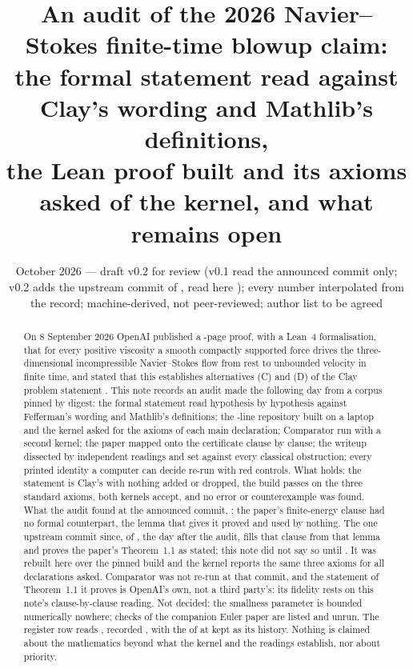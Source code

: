 \documentclass[11pt]{article}
\title{An audit of the 2026 Navier--Stokes finite-time blowup claim:\\
the formal statement read against Clay's wording and Mathlib's definitions,\\
the Lean proof built and its axioms asked of the kernel, and what remains open}
\author{\cmauthor}
\date{October 2026 --- draft v0.2 for review (v0.1 read the announced commit only; v0.2 adds the upstream commit of \UpCommitDate, read here \UpReadOn); every number interpolated from the record; machine-derived, not peer-reviewed; author list to be agreed}
\newcommand{\lean}[1]{\texttt{#1}}
\begin{document}
\maketitle

\begin{abstract}
On 8 September 2026 OpenAI published a \PaperPages-page proof, with a Lean~4 formalisation,
that for every positive viscosity a smooth compactly supported force drives the
three-dimensional incompressible Navier--Stokes flow from rest to unbounded velocity in
finite time, and stated that this establishes alternatives (C) and (D) of the Clay problem
statement \cite{OAIann,OAINS,Fef00}. This note records an audit made the following day from
a corpus pinned by digest: the formal statement read hypothesis by hypothesis against
Fefferman's wording and Mathlib's definitions; the \LeanLines-line repository built on a
laptop and the kernel asked for the axioms of each main declaration; Comparator run with a
second kernel; the paper mapped onto the certificate clause by clause; the writeup dissected
by \Readers{} independent readings and set against every classical obstruction; every
printed identity a computer can decide re-run with red controls. What
holds: the statement is Clay's with nothing added or dropped, the build passes on the three
standard axioms, both kernels accept, and no error or counterexample was found. What the
audit found at the announced commit, \lean{\LeanCommit}: the paper's finite-energy clause had
no formal counterpart, the lemma that gives it proved and used by nothing. The one upstream
commit since, \lean{\UpCommit} of \UpCommitDate, the day after the audit, fills that clause
from that lemma and proves the paper's Theorem~1.1 as stated; this note did not say so until
\UpReadOn. It was rebuilt here over the pinned build and the kernel reports the same three
axioms for all \UpAxiomDecls{} declarations asked. Comparator was not re-run at that commit,
and the statement of Theorem~1.1 it proves is OpenAI's own, not a third party's: its fidelity
rests on this note's clause-by-clause reading. Not decided: the smallness parameter is bounded numerically nowhere;
\EulerChecksUnrun{} checks of the companion Euler paper are listed and unrun. The register row
reads \textsc{\LedgerVerdict}, recorded \LedgerRecorded, with the
\textsc{\LedgerPriorVerdict} of \LedgerPriorRecorded{} at \lean{\LedgerPriorAt}
kept as its history. Nothing is claimed about the mathematics beyond what the kernel and the
readings establish, nor about priority.
\end{abstract}
\end{document}
